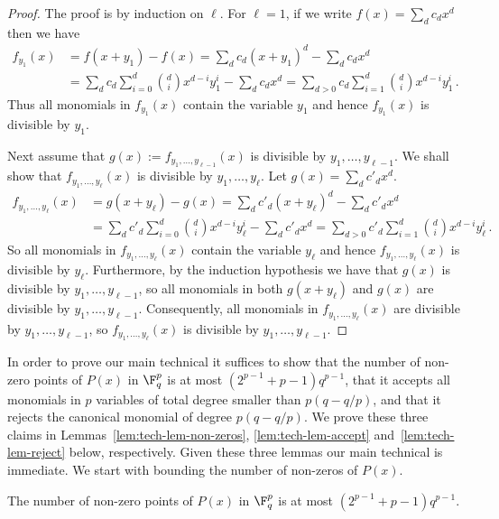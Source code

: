 \begin{proof}
The proof is by induction on $\ell$. 
For $\ell =1$, if we write $f(x) = \sum_{d} c_d x^d$ then we have
%
\begin{align*}
f_{y_1}(x) & =  f(x+y_1) - f(x) = \sum_{d} c_d (x+y_1)^d - \sum_{d} c_d x^d \\
 & =   \sum_{d} c_d \sum_{i=0}^d \binom {d} {i} x^{d-i} y_1^{i} - \sum_{d} c_d x^d = \sum_{d >0} c_d \sum_{i=1}^d \binom {d} {i} x^{d-i} y_1^{i}\,.
\end{align*}
%
Thus all monomials in $f_{y_1}(x)$ contain the variable $y_1$ and hence $f_{y_1}(x)$ is divisible by $y_1$.

Next assume that $g(x):=f_{y_1,\ldots,y_{\ell -1}}(x)$ is divisible by $y_1,\ldots,y_{\ell-1}$. We shall show that $f_{y_1,\ldots,y_{\ell}}(x)$ is divisible by $y_1,\ldots,y_{\ell}$. Let $g(x)=\sum_{d} c'_d x^d$.
\begin{align*}
f_{y_1,\ldots,y_{\ell}}(x) & =  g(x+y_{\ell}) - g(x) = \sum_{d} c'_d (x+y_\ell)^d - \sum_{d} c'_d x^d \\
 & =   \sum_{d} c'_d \sum_{i=0}^d \binom {d} {i} x^{d-i} y_\ell^{i} - \sum_{d} c'_d x^d = \sum_{d >0} c'_d \sum_{i=1}^d \binom {d} {i} x^{d-i} y_\ell^{i}\,.
\end{align*}
So all monomials in $f_{y_1,\ldots,y_{\ell}}(x)$ contain the variable $y_\ell$ and hence $f_{y_1,\ldots,y_{\ell}}(x)$ is divisible by $y_\ell$. Furthermore, by the induction hypothesis we have that $g(x)$ is divisible by $y_1,\ldots,y_{\ell-1}$, so all monomials in both $g(x+y_{\ell})$ and $g(x)$ are divisible by $y_1,\ldots,y_{\ell-1}$. Consequently, all monomials in  $f_{y_1,\ldots,y_{\ell}}(x)$ are divisible by $y_1,\ldots,y_{\ell-1}$, so   $f_{y_1,\ldots,y_{\ell}}(x)$ is divisible by $y_1,\ldots,y_{\ell-1}$.
\end{proof}

In order to prove our main technical  it suffices to show that the number of non-zero points of $P(x)$ in $\F_{q}^p$ is at most
$(2^{p-1}+p-1)q^{p-1}$, that it accepts all monomials in $p$ variables of total degree smaller than $p(q-q/p)$, and that it rejects the canonical monomial of degree $
p(q-q/p)$. We prove these three claims in Lemmas~\ref{lem:tech-lem-non-zeros}, \ref{lem:tech-lem-accept} and~\ref{lem:tech-lem-reject} below, respectively. Given these three
lemmas our main technical  is immediate. We start with bounding the number of non-zeros of $P(x)$.

\begin{lemma}\label{lem:tech-lem-non-zeros}
The number of non-zero points of $P(x)$ in $\F_{q}^p$ is at most $(2^{p-1}+p-1)q^{p-1}$.
\end{lemma}

